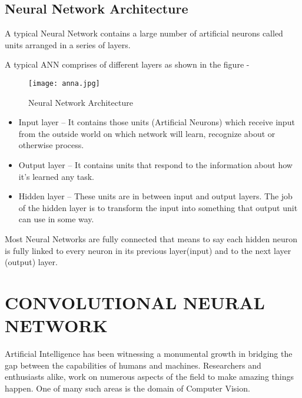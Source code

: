\documentclass[a4paper,12pt]{report}
\begin{document}
\paragraph{}

\section{Neural Network Architecture}
A typical Neural Network contains a large number of artificial neurons called units arranged in a series of layers. 

A typical ANN comprises of different layers as shown in the figure - 
\vspace*{0.2cm}
\begin{figure}[!h]
	\begin{center}
		\texttt{[image: anna.jpg]}    
		\caption{Neural Network Architecture}
		\label{fig1}
	\end{center}
\end{figure}
\vspace*{0.2cm}

\begin{itemize}
	\item Input layer – It contains those units (Artificial Neurons) which receive input from the outside world on which network will learn, recognize about or otherwise process.
	\item Output layer – It contains units that respond to the information about how it’s learned any task.
	\item Hidden layer – These units are in between input and output layers. The job of the hidden layer is to transform the input into something that output unit can use in some way.
\end{itemize}

Most Neural Networks are fully connected that means to say each hidden neuron is fully linked to every neuron in its previous layer(input) and to the next layer (output) layer.

\newpage
\renewcommand\chaptername{CHAPTER}
\chapter{CONVOLUTIONAL NEURAL NETWORK}
Artificial Intelligence has been witnessing a monumental growth in bridging the gap between the capabilities of humans and machines. Researchers and enthusiasts alike, work on numerous aspects of the field to make amazing things happen. One of many such areas is the domain of Computer Vision.
\end{document}
